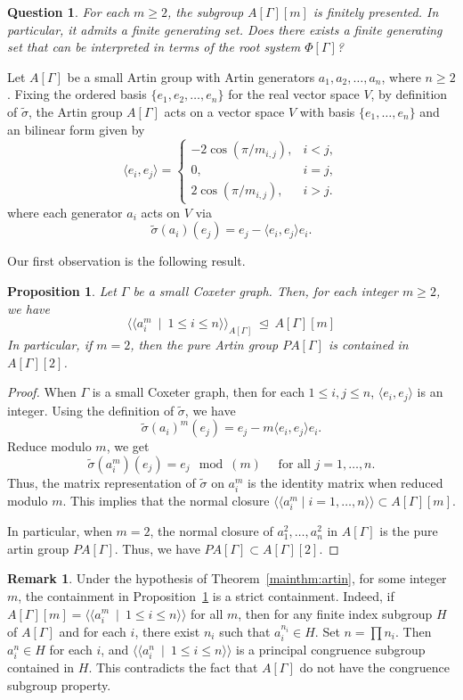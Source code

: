 \documentclass[12pt]{amsart}
\newtheorem{proposition}[equation]{Proposition}
\newtheorem{question}[equation]{Question}
\theoremstyle{definition}
\newtheorem{remark}[equation]{Remark}
\numberwithin{equation}{section}
\begin{document}
\begin{question}
For each $m\geq 2$, the subgroup $A[\Gamma][m]$ is finitely presented. In particular, it admits a finite generating set. Does there exists a finite generating set that can be interpreted in terms of the root system $\Phi[\Gamma]$?
\end{question}
Let $A[\Gamma]$ be a small Artin group with Artin generators $a_1,a_2,\ldots,a_{n}$, where $n \ge 2$. Fixing the ordered basis $\{e_1,e_2,\ldots,e_{n}\}$ for the real vector space $V$, by definition of $\tilde{\sigma}$, the Artin group $A[\Gamma]$ acts on a vector space $V$ with basis $\{e_1, \ldots, e_n\}$ and an bilinear form given by
$$
\langle e_i, e_j \rangle = \begin{cases}
 -2 \cos (\pi / m_{i, j}), & i<j, \\ 0, & i=j, \\ 2 \cos (\pi / m_{i, j}), & i>j .
\end{cases}
$$
where each generator $a_i$ acts on $V$ via
$$
\tilde{\sigma}(a_i)(e_j) = e_j - \langle e_i, e_j \rangle e_i.
$$


Our first observation is the following result.

\begin{proposition}\label{prop:level2}
Let $\Gamma$ be a small Coxeter graph. Then, for each integer $m \ge 2$, we have
$$\langle \langle a_i^m ~\mid~ 1 \le i \le n\rangle \rangle_{A[\Gamma]}~ \unlhd ~A[\Gamma][m]$$
In particular, if $m=2$, then the pure Artin group $PA[\Gamma]$ is contained in $A[\Gamma][2]$.
\end{proposition}
\begin{proof}
When $\Gamma$ is a small Coxeter graph, then for each $1 \le i, j \le n$, $\langle e_i, e_j\rangle$ is an integer. Using the definition of $\tilde{\sigma}$,  we have
$$
\tilde{\sigma}(a_i)^m(e_j)=e_j-m\langle e_i, e_j\rangle e_i. 
$$ 
Reduce modulo $m$, we get 
$$
\tilde{\sigma}(a_i^m)(e_j) = e_j \mod(m) \quad \text { for all } j=1,\ldots, n.
$$
 Thus, the matrix representation of $\tilde{\sigma}$ on $a_i^m$ is the identity matrix when reduced modulo $m$. This implies that the normal closure $\langle \langle a_i^m \mid i=1,\ldots, n \rangle\rangle\subset A[\Gamma][m]$.

In particular, when $m = 2$,  the normal closure of $a_1^2, \ldots, a_n^2$ in $A[\Gamma]$ is the pure artin group $PA[\Gamma]$. Thus, we have $PA[\Gamma] \subset A[\Gamma][2]$.
\end{proof}
\begin{remark}
Under the hypothesis of Theorem~\ref{mainthm:artin}, for some integer $m$, the containment in Proposition~\ref{prop:level2} is a strict containment. Indeed, if $A[\Gamma][m]=\langle \langle a_i^m ~\mid~ 1 \le i \le n\rangle\rangle$ for all $m$, then for any finite index subgroup $H$ of $A[\Gamma]$  and for each $i$, there exist $n_i$ such that $a_i^{n_i} \in H$. Set $n=\prod n_i$. Then $a_i^n \in H$ for each $i$, and $\langle \langle a_i^n ~\mid~ 1 \le i \le n\rangle\rangle$  is a principal congruence subgroup contained in $H$. This contradicts the fact that $A[\Gamma]$ do not have the congruence subgroup property.
\end{remark}
\end{document}
